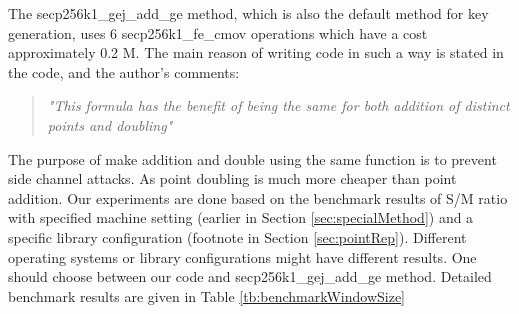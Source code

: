 The secp256k1\_gej\_add\_ge method, which is also the default method for key generation, uses 6 secp256k1\_fe\_cmov operations which have a cost approximately 0.2 M. The main reason of writing code in such a way is stated in the code, and the author's comments: 
\begin{quotation}
\textit{"This formula has the benefit of being the same for both addition of distinct points and doubling"\cite{Wulliesecp256k1}}
\end{quotation}
The purpose of make addition and double using the same function is to prevent side channel attacks. As point doubling is much more cheaper than point addition. Our experiments are done based on the benchmark results of S/M ratio with specified machine setting (earlier in Section \ref{sec:specialMethod}) and a specific library configuration (footnote in Section \ref{sec:pointRep}). Different operating systems or library configurations might have different results. One should choose between our code and secp256k1\_gej\_add\_ge method. Detailed benchmark results are given in Table \ref{tb:benchmarkWindowSize}


